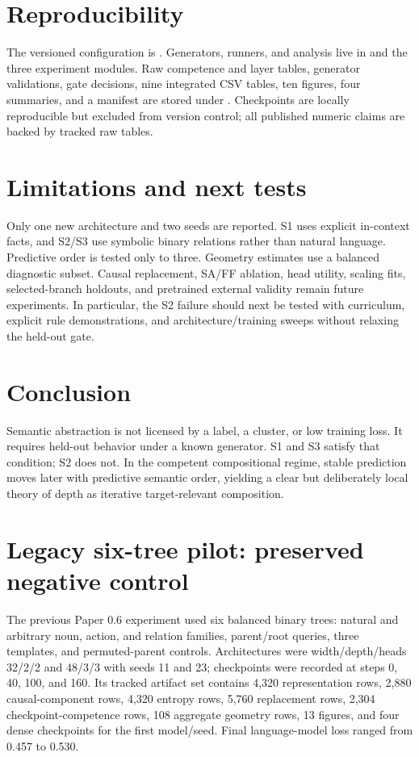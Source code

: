 \documentclass[10pt]{article}
\begin{document}
\section{Reproducibility}
The versioned configuration is .  Generators, runners, and analysis live in  and the three  experiment modules.  Raw competence and layer tables, generator validations, gate decisions, nine integrated CSV tables, ten figures, four summaries, and a manifest are stored under .  Checkpoints are locally reproducible but excluded from version control; all published numeric claims are backed by tracked raw tables.

\section{Limitations and next tests}
Only one new architecture and two seeds are reported.  S1 uses explicit in-context facts, and S2/S3 use symbolic binary relations rather than natural language.  Predictive order is tested only to three.  Geometry estimates use a balanced diagnostic subset.  Causal replacement, SA/FF ablation, head utility, scaling fits, selected-branch holdouts, and pretrained external validity remain future experiments.  In particular, the S2 failure should next be tested with curriculum, explicit rule demonstrations, and architecture/training sweeps without relaxing the held-out gate.

\section{Conclusion}
Semantic abstraction is not licensed by a label, a cluster, or low training loss.  It requires held-out behavior under a known generator.  S1 and S3 satisfy that condition; S2 does not.  In the competent compositional regime, stable prediction moves later with predictive semantic order, yielding a clear but deliberately local theory of depth as iterative target-relevant composition.

\appendix
\section{Legacy six-tree pilot: preserved negative control}
The previous Paper 0.6 experiment used six balanced binary trees: natural and arbitrary noun, action, and relation families, parent/root queries, three templates, and permuted-parent controls.  Architectures were width/depth/heads 32/2/2 and 48/3/3 with seeds 11 and 23; checkpoints were recorded at steps 0, 40, 100, and 160.  Its tracked artifact set contains 4,320 representation rows, 2,880 causal-component rows, 4,320 entropy rows, 5,760 replacement rows, 2,304 checkpoint-competence rows, 108 aggregate geometry rows, 13 figures, and four dense checkpoints for the first model/seed.  Final language-model loss ranged from 0.457 to 0.530.
\end{document}
